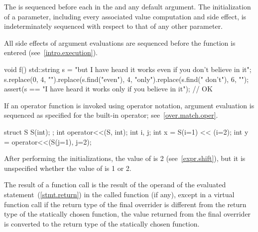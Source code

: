 \pnum
{}%
%
%
The  is sequenced before
each  in the 
and any default argument.
The initialization of a parameter,
including every associated value computation and side effect,
is indeterminately sequenced with respect to that of any other parameter.
\begin{note}
All side effects of
argument evaluations are sequenced before the function is
entered (see~\ref{intro.execution}).
\end{note}
\begin{example}
\begin{codeblock}
void f() {
  std::string s = "but I have heard it works even if you don't believe in it";
  s.replace(0, 4, "").replace(s.find("even"), 4, "only").replace(s.find(" don't"), 6, "");
  assert(s == "I have heard it works only if you believe in it"); // OK
}
\end{codeblock}
\end{example}
\begin{note}
If an operator function is invoked
using operator notation,
argument evaluation is sequenced
as specified for the built-in operator;
see~\ref{over.match.oper}.
\end{note}
\begin{example}
\begin{codeblock}
struct S {
  S(int);
};
int operator<<(S, int);
int i, j;
int x = S(i=1) << (i=2);
int y = operator<<(S(j=1), j=2);
\end{codeblock}
After performing the initializations,
the value of  is 2 (see~\ref{expr.shift}),
but it is unspecified whether the value of  is 1 or 2.
\end{example}

\pnum
The result of a function call is the
result of the operand of the evaluated  statement~(\ref{stmt.return})
in the called function (if any),
except in a virtual function call if the return type of the
final overrider is different from the return type of the statically
chosen function, the value returned from the final overrider is
converted to the return type of the statically chosen function.

